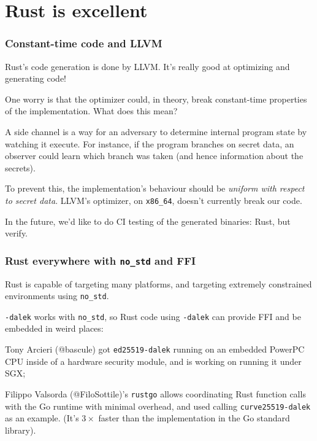 \documentclass[xetex,aspectratio=169]{beamer}
\begin{document}
\section{Rust is excellent}

  \begin{frame}
    \frametitle{Constant-time code and LLVM}
    
    Rust's code generation is done by LLVM. \pause It's really good at optimizing and generating code!

    \pause One worry is that the optimizer could, in theory, break \alert{constant-time} properties of the implementation.  What does this mean?

    \pause A side channel is a way for an adversary to determine internal program state by watching it execute.  \pause For instance, if the program branches on secret data, an observer could learn which branch was taken (and hence information about the secrets).

    \pause To prevent this, the implementation's behaviour should be \emph{uniform with respect to secret data}.
    \pause LLVM's optimizer, on \texttt{x86\_64}, doesn't currently break our code.  

    \pause In the future, we'd like to do CI testing of the generated binaries: Rust, but verify.
  \end{frame}

  \begin{frame}
    \frametitle{Rust everywhere with \texttt{no\_std} and FFI}
    
    Rust is capable of targeting many platforms, and targeting extremely constrained environments using \texttt{no\_std}.
    
    \pause \texttt{-dalek} works with \texttt{no\_std}, so Rust code using \texttt{-dalek} can provide FFI and be embedded in weird places:
    
    \pause Tony Arcieri (@bascule) got \texttt{ed25519-dalek} running on an
embedded PowerPC CPU inside of a hardware security module, and is working on running it under SGX;
    
    \pause Filippo Valsorda (@FiloSottile)'s \texttt{rustgo} allows coordinating Rust
function calls with the Go runtime with minimal overhead, and used
calling \texttt{curve25519-dalek} as an example. \pause (It's $3\times{} $ faster than the implementation in the Go standard library).

  \end{frame}
\end{document}
